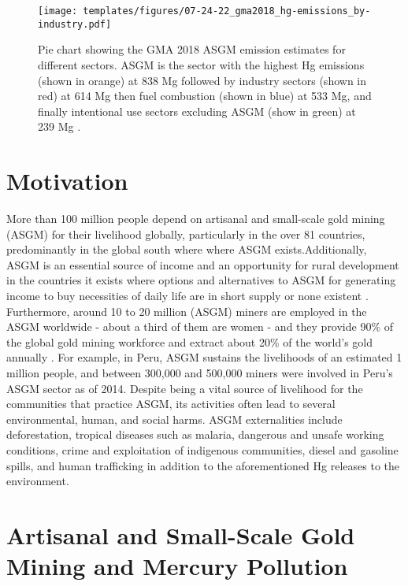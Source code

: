 \begin{figure}[H]
  \texttt{[image: templates/figures/07-24-22\_gma2018\_hg-emissions\_by-industry.pdf]}
  \centering
  \caption{Pie chart showing the GMA 2018 ASGM \hg emission estimates for different sectors. ASGM is the sector with the highest Hg emissions (shown in orange) at 838 Mg followed by industry sectors (shown in red) at 614 Mg then fuel combustion (shown in blue) at 533 Mg, and finally intentional use sectors excluding ASGM (show in green) at 239 Mg \cite{united_nations_environment_programme_technical_2019}.}
  \label{fig:gma2018_hg-emissions_by-industry}
\end{figure}
\FloatBarrier

\section{Motivation}
\begin{flushleft}
More than 100 million people depend on artisanal and small-scale gold mining (ASGM) for their livelihood globally, particularly in the over 81 countries, predominantly in the global south where where ASGM exists.Additionally, ASGM is an essential source of income and an opportunity for rural development in the countries it exists where options and alternatives to ASGM for generating income to buy necessities of daily life are in short supply or none existent \cite{planetgold_planetgold_2021}. Furthermore, around 10 to 20 million (ASGM) miners are employed in the ASGM worldwide - about a third of them are women - and they provide 90\% of the global gold mining workforce and extract about 20\% of the world’s gold annually \cite{planetgold_planetgold_2021}. For example, in Peru, ASGM sustains the livelihoods of an estimated 1 million people, and between 300,000 and 500,000 miners were involved in Peru’s ASGM sector as of 2014. Despite being a vital source of livelihood for the communities that practice ASGM, its activities often lead to several environmental, human, and social harms. ASGM externalities include deforestation, tropical diseases such as malaria, dangerous and unsafe working conditions, crime and exploitation of indigenous communities, diesel and gasoline spills, and human trafficking in addition to the aforementioned Hg releases to the environment\cite{usaid_usaid_2020}. 
\end{flushleft}

\section{Artisanal and Small-Scale Gold Mining and Mercury Pollution}

